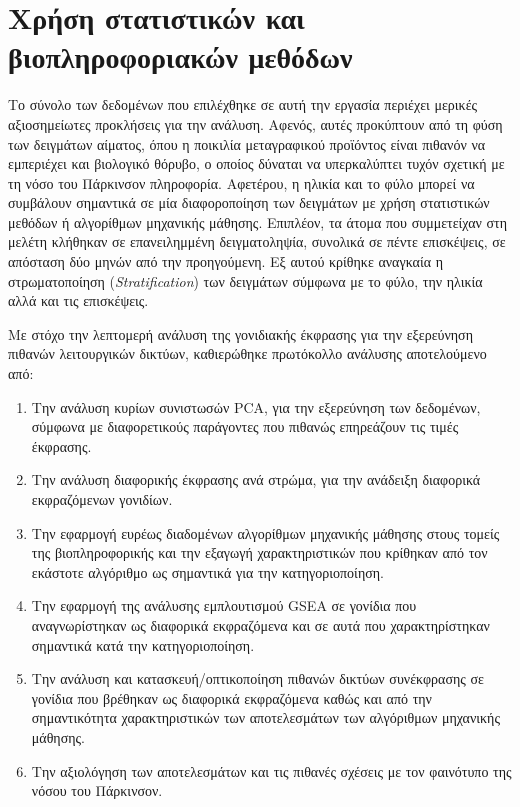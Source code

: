 \documentclass[12pt]{report}
\begin{document}
    \section{Χρήση στατιστικών και βιοπληροφοριακών μεθόδων}
        \par
            Το σύνολο των δεδομένων που επιλέχθηκε σε αυτή την εργασία περιέχει μερικές αξιοσημείωτες προκλήσεις για την ανάλυση. Αφενός, αυτές προκύπτουν από τη φύση των δειγμάτων αίματος, όπου η ποικιλία μεταγραφικού προϊόντος είναι πιθανόν να εμπεριέχει και βιολογικό θόρυβο, ο οποίος δύναται να υπερκαλύπτει τυχόν σχετική με τη νόσο του Πάρκινσον πληροφορία. Αφετέρου, η ηλικία και το φύλο μπορεί να συμβάλουν σημαντικά σε μία διαφοροποίηση των δειγμάτων με χρήση στατιστικών μεθόδων ή αλγορίθμων μηχανικής μάθησης. Επιπλέον, τα άτομα που συμμετείχαν στη μελέτη κλήθηκαν σε επανειλημμένη δειγματοληψία, συνολικά σε πέντε επισκέψεις, σε απόσταση δύο μηνών από την προηγούμενη. Εξ αυτού κρίθηκε αναγκαία η στρωματοποίηση (\emph{Stratification}) των δειγμάτων σύμφωνα με το φύλο, την ηλικία αλλά και τις επισκέψεις.
        \par
            Με στόχο την λεπτομερή ανάλυση της γονιδιακής έκφρασης για την εξερεύνηση πιθανών λειτουργικών δικτύων, καθιερώθηκε πρωτόκολλο ανάλυσης αποτελούμενο από:
            \begin{enumerate}
                \item Την ανάλυση κυρίων συνιστωσών PCA, για την εξερεύνηση των δεδομένων, σύμφωνα με διαφορετικούς παράγοντες που πιθανώς επηρεάζουν τις τιμές έκφρασης.
                \item Την ανάλυση διαφορικής έκφρασης ανά στρώμα, για την ανάδειξη διαφορικά εκφραζόμενων γονιδίων.
                \item Την εφαρμογή ευρέως διαδομένων αλγορίθμων μηχανικής μάθησης στους τομείς της βιοπληροφορικής και την εξαγωγή χαρακτηριστικών που κρίθηκαν από τον εκάστοτε αλγόριθμο ως σημαντικά για την κατηγοριοποίηση.
                \item Την εφαρμογή της ανάλυσης εμπλουτισμού GSEA σε γονίδια που αναγνωρίστηκαν ως διαφορικά εκφραζόμενα και σε αυτά που χαρακτηρίστηκαν σημαντικά κατά την κατηγοριοποίηση.
                \item Την ανάλυση και κατασκευή/οπτικοποίηση πιθανών δικτύων συνέκφρασης σε γονίδια που βρέθηκαν ως διαφορικά εκφραζόμενα καθώς και από την σημαντικότητα χαρακτηριστικών των αποτελεσμάτων των αλγόριθμων μηχανικής μάθησης.
                \item Την αξιολόγηση των αποτελεσμάτων και τις πιθανές σχέσεις με τον φαινότυπο της νόσου του Πάρκινσον.
            \end{enumerate}
\end{document}

